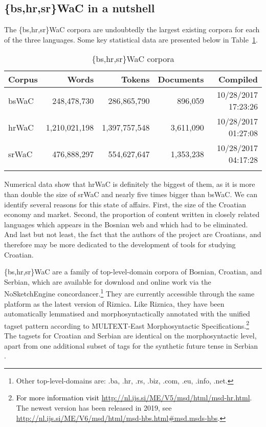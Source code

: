 \subsection{\{bs,hr,sr\}WaC in a nutshell}
The \{bs,hr,sr\}WaC corpora are undoubtedly the largest existing corpora for each of the three languages. Some key statistical data are presented below in Table~\ref{table:wac1}.

\begin{table}
\caption{\{bs,hr,sr\}WaC corpora\label{table:wac1}}
\begin{tabular}{lrrrr}
\lsptoprule
Corpus & Words & Tokens & Documents & Compiled\\
\midrule
bsWaC&	248,478,730	&	286,865,790	&	896,059 &	10/28/2017 17:23:26\\
hrWaC&	1,210,021,198 &	1,397,757,548 &	3,611,090 &	10/28/2017 01:27:08\\
srWaC&	476,888,297	&	554,627,647	&	1,353,238 &	10/28/2017 04:17:28\\
\lspbottomrule
\end{tabular}
\end{table}

Numerical data show that hrWaC is definitely the biggest of them, as it is more than double the size of srWaC and nearly five times bigger than bsWaC. We can identify several reasons for this state of affairs. First, the size of the Croatian economy and market. Second, the proportion of content written in closely related languages which appears in the Bosnian web and which had to be eliminated. And last but not least, the fact that the authors of the project are Croatians, and therefore may be more dedicated to the development of tools for studying Croatian.

\begin{sloppypar}
\{bs,hr,sr\}WaC are a family of top-level-domain corpora of Bosnian, Croatian, and Serbian, which are available for download and online work via the  NoSketchEngine concordancer.\footnote{Other top-level-domains are: .ba, .hr, .rs, .biz, .com, .eu, .info, .net.} They are currently accessible through the same platform as the latest version of Riznica. Like Riznica, they have been automatically lemmatised and morphosyntactically annotated with the unified tagset pattern according to MULTEXT-East Morphosyntactic Specifications.\footnote{\textcolor{black}{For more information visit} \url{http://nl.ijs.si/ME/V5/msd/html/msd-hr.html}. The newest version has been released in 2019, see \url{http://nl.ijs.si/ME/V6/msd/html/msd-hbs.html\#msd.msds-hbs}.} The tagsets for Croatian and Serbian are identical on the morphosyntactic level, apart from one additional subset of tags for the synthetic future tense in Serbian \citep[31]{LjubesicKlubicka14}. 
\end{sloppypar}

